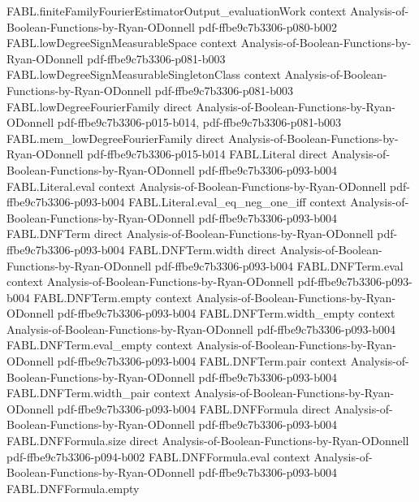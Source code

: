 \begin{theorem}
\proofstep
  {FABL.finiteFamilyFourierEstimatorOutput_evaluationWork}
  {context}
  {Analysis-of-Boolean-Functions-by-Ryan-ODonnell}
  {pdf-ffbe9c7b3306-p080-b002}
\proofstep
  {FABL.lowDegreeSignMeasurableSpace}
  {context}
  {Analysis-of-Boolean-Functions-by-Ryan-ODonnell}
  {pdf-ffbe9c7b3306-p081-b003}
\proofstep
  {FABL.lowDegreeSignMeasurableSingletonClass}
  {context}
  {Analysis-of-Boolean-Functions-by-Ryan-ODonnell}
  {pdf-ffbe9c7b3306-p081-b003}
\proofstep
  {FABL.lowDegreeFourierFamily}
  {direct}
  {Analysis-of-Boolean-Functions-by-Ryan-ODonnell}
  {pdf-ffbe9c7b3306-p015-b014,
    pdf-ffbe9c7b3306-p081-b003}
\proofstep
  {FABL.mem_lowDegreeFourierFamily}
  {direct}
  {Analysis-of-Boolean-Functions-by-Ryan-ODonnell}
  {pdf-ffbe9c7b3306-p015-b014}
\proofstep
  {FABL.Literal}
  {direct}
  {Analysis-of-Boolean-Functions-by-Ryan-ODonnell}
  {pdf-ffbe9c7b3306-p093-b004}
\proofstep
  {FABL.Literal.eval}
  {context}
  {Analysis-of-Boolean-Functions-by-Ryan-ODonnell}
  {pdf-ffbe9c7b3306-p093-b004}
\proofstep
  {FABL.Literal.eval_eq_neg_one_iff}
  {context}
  {Analysis-of-Boolean-Functions-by-Ryan-ODonnell}
  {pdf-ffbe9c7b3306-p093-b004}
\proofstep
  {FABL.DNFTerm}
  {direct}
  {Analysis-of-Boolean-Functions-by-Ryan-ODonnell}
  {pdf-ffbe9c7b3306-p093-b004}
\proofstep
  {FABL.DNFTerm.width}
  {direct}
  {Analysis-of-Boolean-Functions-by-Ryan-ODonnell}
  {pdf-ffbe9c7b3306-p093-b004}
\proofstep
  {FABL.DNFTerm.eval}
  {context}
  {Analysis-of-Boolean-Functions-by-Ryan-ODonnell}
  {pdf-ffbe9c7b3306-p093-b004}
\proofstep
  {FABL.DNFTerm.empty}
  {context}
  {Analysis-of-Boolean-Functions-by-Ryan-ODonnell}
  {pdf-ffbe9c7b3306-p093-b004}
\proofstep
  {FABL.DNFTerm.width_empty}
  {context}
  {Analysis-of-Boolean-Functions-by-Ryan-ODonnell}
  {pdf-ffbe9c7b3306-p093-b004}
\proofstep
  {FABL.DNFTerm.eval_empty}
  {context}
  {Analysis-of-Boolean-Functions-by-Ryan-ODonnell}
  {pdf-ffbe9c7b3306-p093-b004}
\proofstep
  {FABL.DNFTerm.pair}
  {context}
  {Analysis-of-Boolean-Functions-by-Ryan-ODonnell}
  {pdf-ffbe9c7b3306-p093-b004}
\proofstep
  {FABL.DNFTerm.width_pair}
  {context}
  {Analysis-of-Boolean-Functions-by-Ryan-ODonnell}
  {pdf-ffbe9c7b3306-p093-b004}
\proofstep
  {FABL.DNFFormula}
  {direct}
  {Analysis-of-Boolean-Functions-by-Ryan-ODonnell}
  {pdf-ffbe9c7b3306-p093-b004}
\proofstep
  {FABL.DNFFormula.size}
  {direct}
  {Analysis-of-Boolean-Functions-by-Ryan-ODonnell}
  {pdf-ffbe9c7b3306-p094-b002}
\proofstep
  {FABL.DNFFormula.eval}
  {context}
  {Analysis-of-Boolean-Functions-by-Ryan-ODonnell}
  {pdf-ffbe9c7b3306-p093-b004}
\proofstep
  {FABL.DNFFormula.empty}

\end{theorem}
